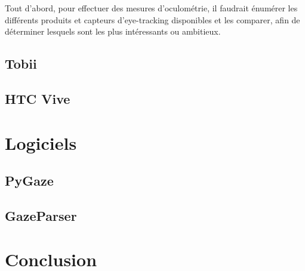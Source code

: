 \documentclass{article}
\begin{document}
Tout d'abord, pour effectuer des mesures d'oculométrie, il faudrait énumérer les
différents produits et capteurs d'eye-tracking disponibles et les comparer, afin de déterminer lesquels sont les plus intéressants ou ambitieux.

\subsection{Tobii}

\cite{tobii}
\cite{yt:tobii_vr}

\subsection{HTC Vive}


\section{Logiciels}

\subsection{PyGaze}

\subsection{GazeParser}


\section{Conclusion}


\pagebreak


\end{document}
